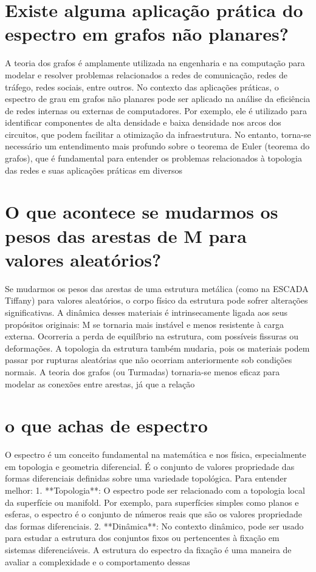 \documentclass[11pt,a4paper]{article}
\begin{document}
\section{Existe alguma aplicação prática do espectro em grafos não planares?}
A teoria dos grafos é amplamente utilizada na engenharia e na computação para modelar e resolver problemas relacionados a redes de comunicação, redes de tráfego, redes sociais, entre outros. No contexto das aplicações práticas, o espectro de grau em grafos não planares pode ser aplicado na análise da eficiência de redes internas ou externas de computadores. Por exemplo, ele é utilizado para identificar componentes de alta densidade e baixa densidade nos arcos dos circuitos, que podem facilitar a otimização da infraestrutura. No entanto, torna-se necessário um entendimento mais profundo sobre o teorema de Euler (teorema do grafos), que é fundamental para entender os problemas relacionados à topologia das redes e suas aplicações práticas em diversos

\section{O que acontece se mudarmos os pesos das arestas de M para valores aleatórios?}
Se mudarmos os pesos das arestas de uma estrutura metálica (como na ESCADA Tiffany) para valores aleatórios, o corpo físico da estrutura pode sofrer alterações significativas. A dinâmica desses materiais é intrinsecamente ligada aos seus propósitos originais: M se tornaria mais instável e menos resistente à carga externa. Ocorreria a perda de equilíbrio na estrutura, com possíveis fissuras ou deformações. A topologia da estrutura também mudaria, pois os materiais podem passar por rupturas aleatórias que não ocorriam anteriormente sob condições normais. A teoria dos grafos (ou Turmadas) tornaria-se menos eficaz para modelar as conexões entre arestas, já que a relação

\section{o que achas de espectro}
O espectro é um conceito fundamental na matemática e nos física, especialmente em topologia e geometria diferencial. É o conjunto de valores propriedade das formas diferenciais definidas sobre uma variedade topológica. Para entender melhor: 1. **Topologia**: O espectro pode ser relacionado com a topologia local da superfície ou manifold. Por exemplo, para superfícies simples como planos e esferas, o espectro é o conjunto de números reais que são os valores propriedade das formas diferenciais. 2. **Dinâmica**: No contexto dinâmico, pode ser usado para estudar a estrutura dos conjuntos fixos ou pertencentes à fixação em sistemas diferenciáveis. A estrutura do espectro da fixação é uma maneira de avaliar a complexidade e o comportamento dessas
\end{document}
